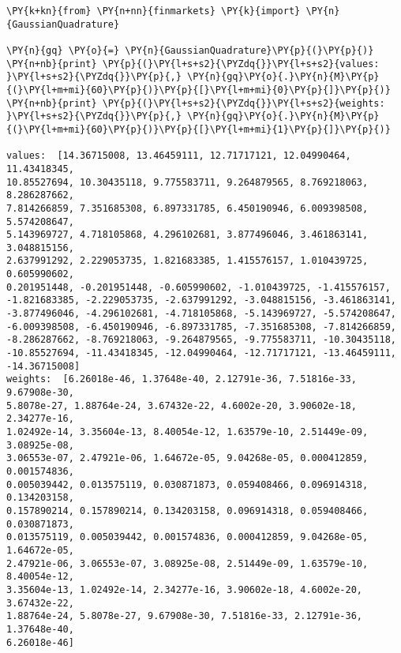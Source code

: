 \begin{codebox}[breakable, size=fbox, boxrule=1pt, pad at break*=1mm,colback=cellbackground, colframe=cellborder]
\begin{Verbatim}[commandchars=\\\{\}]
\PY{k+kn}{from} \PY{n+nn}{finmarkets} \PY{k}{import} \PY{n}{GaussianQuadrature}
	
\PY{n}{gq} \PY{o}{=} \PY{n}{GaussianQuadrature}\PY{p}{(}\PY{p}{)}
\PY{n+nb}{print} \PY{p}{(}\PY{l+s+s2}{\PYZdq{}}\PY{l+s+s2}{values: }\PY{l+s+s2}{\PYZdq{}}\PY{p}{,} \PY{n}{gq}\PY{o}{.}\PY{n}{M}\PY{p}{(}\PY{l+m+mi}{60}\PY{p}{)}\PY{p}{[}\PY{l+m+mi}{0}\PY{p}{]}\PY{p}{)}
\PY{n+nb}{print} \PY{p}{(}\PY{l+s+s2}{\PYZdq{}}\PY{l+s+s2}{weights: }\PY{l+s+s2}{\PYZdq{}}\PY{p}{,} \PY{n}{gq}\PY{o}{.}\PY{n}{M}\PY{p}{(}\PY{l+m+mi}{60}\PY{p}{)}\PY{p}{[}\PY{l+m+mi}{1}\PY{p}{]}\PY{p}{)}

values:  [14.36715008, 13.46459111, 12.71717121, 12.04990464, 11.43418345,
10.85527694, 10.30435118, 9.775583711, 9.264879565, 8.769218063, 8.286287662,
7.814266859, 7.351685308, 6.897331785, 6.450190946, 6.009398508, 5.574208647,
5.143969727, 4.718105868, 4.296102681, 3.877496046, 3.461863141, 3.048815156,
2.637991292, 2.229053735, 1.821683385, 1.415576157, 1.010439725, 0.605990602,
0.201951448, -0.201951448, -0.605990602, -1.010439725, -1.415576157,
-1.821683385, -2.229053735, -2.637991292, -3.048815156, -3.461863141,
-3.877496046, -4.296102681, -4.718105868, -5.143969727, -5.574208647,
-6.009398508, -6.450190946, -6.897331785, -7.351685308, -7.814266859,
-8.286287662, -8.769218063, -9.264879565, -9.775583711, -10.30435118,
-10.85527694, -11.43418345, -12.04990464, -12.71717121, -13.46459111,
-14.36715008]
weights:  [6.26018e-46, 1.37648e-40, 2.12791e-36, 7.51816e-33, 9.67908e-30,
5.8078e-27, 1.88764e-24, 3.67432e-22, 4.6002e-20, 3.90602e-18, 2.34277e-16,
1.02492e-14, 3.35604e-13, 8.40054e-12, 1.63579e-10, 2.51449e-09, 3.08925e-08,
3.06553e-07, 2.47921e-06, 1.64672e-05, 9.04268e-05, 0.000412859, 0.001574836,
0.005039442, 0.013575119, 0.030871873, 0.059408466, 0.096914318, 0.134203158,
0.157890214, 0.157890214, 0.134203158, 0.096914318, 0.059408466, 0.030871873,
0.013575119, 0.005039442, 0.001574836, 0.000412859, 9.04268e-05, 1.64672e-05,
2.47921e-06, 3.06553e-07, 3.08925e-08, 2.51449e-09, 1.63579e-10, 8.40054e-12,
3.35604e-13, 1.02492e-14, 2.34277e-16, 3.90602e-18, 4.6002e-20, 3.67432e-22,
1.88764e-24, 5.8078e-27, 9.67908e-30, 7.51816e-33, 2.12791e-36, 1.37648e-40,
6.26018e-46]
\end{Verbatim}
\end{codebox}
